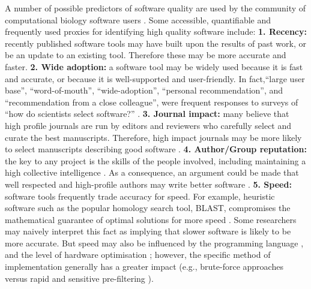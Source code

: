 \documentclass{bmcart}
\begin{document}
A number of possible predictors of software quality are used by the
community of computational biology software users \cite{Hannay2009-cf,Joppa2013-vj,Loman2015-bw}. 
Some accessible, quantifiable and frequently used proxies for identifying high quality
software include: \textbf{1. Recency:} recently published software
tools may have built upon the results of past work, or be an update to
an existing tool. Therefore these may be more accurate and
faster. \textbf{2. Wide adoption:} a software tool may be widely used
because it is fast and accurate, or because it is well-supported and
user-friendly. In fact,``large user base'', ``word-of-mouth'',
``wide-adoption'', ``personal recommendation'', and ``recommendation from a
close colleague'', were frequent responses to surveys of ``how do
scientists select software?''
\cite{Hannay2009-cf,Joppa2013-vj,Loman2015-bw}. \textbf{3. Journal
impact:} {\color{red}many believe that} high profile journals are run by editors and reviewers who
carefully select and curate the best manuscripts. Therefore, high
impact journals may be more likely to select manuscripts describing
good software \cite{Garfield1955-wf}. \textbf{4. Author/Group
reputation:} the key to any project is the skills of the people
involved, including maintaining a high collective intelligence
\cite{Joppa2013-vj,Woolley2010-ld,Cheruvelil2014-xn}. As a
consequence, an argument could be made that well respected and
high-profile authors may write better software
\cite{Hirsch2005-mt,Bornmann2008-il}. \textbf{5. Speed:} software tools
frequently trade accuracy for speed. For example, heuristic
software such as the popular homology search tool, BLAST, compromises
the mathematical guarantee of optimal solutions for more speed
\cite{Altschul1990-ht,Altschul1997-ga}. Some researchers may naively
interpret this fact as implying that slower software is likely to be more
accurate. But speed may also be influenced by the programming language
\cite{Fourment2008-vl}, and the level of hardware optimisation
\cite{Farrar2007-ky,Dematte2010-ph};
{\color{red}however}, the specific method of implementation generally has a greater impact (e.g., brute-force approaches versus
rapid and sensitive pre-filtering
\cite{Schaeffer1989-mu,Papadimitriou_undated-bo,leiserson2020there}).

\end{document}
